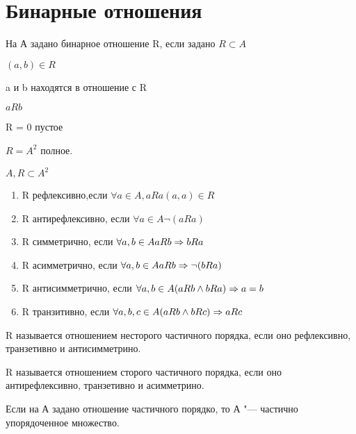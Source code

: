 ﻿\section{Бинарные отношения}
\begin{Def}
На А задано бинарное отношение R, если задано $R \subset A$

$(a, b) \in R$

a и b находятся в отношение с R

$a R b$

R = 0 пустое

$R = A^2$ полное. 
\end{Def}

\begin{Def}
$A, R \subset A^2$
\begin{enumerate}
\item R рефлексивно,если $\forall a \in A, aRa (a, a)\in R$
\item R антирефлексивно, если $\forall a \in A \neg (aRa)$
\item R симметрично, если $\forall a, b \in A aRb \Rightarrow bRa$
\item R асимметрично, если $\forall a, b \in A aRb \Rightarrow \neg(bRa)$
\item R антисимметрично, если $\forall a, b \in A (aRb \wedge bRa) \Rightarrow a = b$
\item R транзитивно, если  $\forall a, b, c \in A (aRb \wedge bRc) \Rightarrow aRc$
\end{enumerate}
\end{Def}

\begin{Def}
R называется отношением несторого частичного порядка, если оно рефлексивно, транзетивно и антисимметрино. 
\end{Def}
\begin{Def}
R называется отношением сторого частичного порядка, если оно антирефлексивно, транзетивно и асимметрино. 
\end{Def}

Если на А задано отношение частичного порядко, то А "--- частично упорядоченное множество.